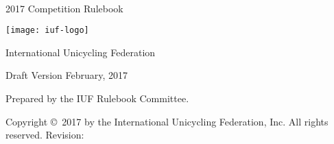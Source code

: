 \begin{titlepage}
\centering
\ \\
\vspace{5cm}
{\Huge 2017 Competition Rulebook}
\vspace{5mm}

\texttt{[image: iuf-logo]}

\vspace{5mm}
{\huge International Unicycling Federation}

\vspace{5mm}
{\Large Draft Version \quad February, 2017}

\vspace{45mm}
Prepared by the IUF Rulebook Committee.

\vspace{5mm}
{\small Copyright \copyright\ 2017 by the International Unicycling Federation, Inc. All rights reserved.}
\small{Revision: \href{https://github.com/iuf/rulebook/commit/\gitHash}{\gitAbbrevHash} \ \gitCommitterDate}

\end{titlepage}
